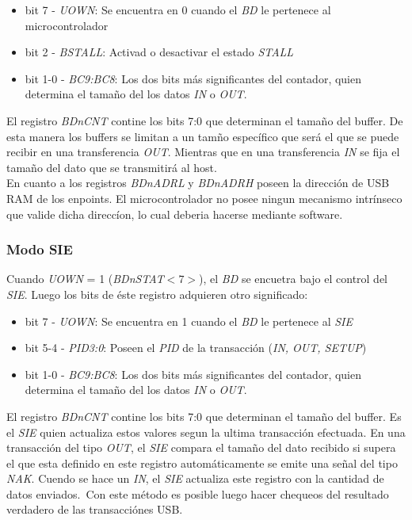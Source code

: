 \begin{itemize}
 \item bit 7 - \emph{UOWN}: Se encuentra en 0 cuando el \emph{BD} le pertenece
al microcontrolador

 \item bit 2 - \emph{BSTALL}: Activad o desactivar el estado \emph{STALL}

 \item bit 1-0 - \emph{BC9:BC8}: Los dos bits m\'as significantes del
contador, quien determina el tama\~no del los datos \emph{IN} o \emph{OUT}.
\end{itemize}

El registro \emph{BDnCNT} contine los bits 7:0 que determinan el tama\~no del
buffer. De esta manera los buffers se limitan a un tam\~no espec\'ifico que
ser\'a el que se puede recibir en una transferencia \emph{OUT}. Mientras que
en una transferencia \emph{IN} se fija el tama\~no del dato que se
transmitir\'a al host.\\

En cuanto a los registros \emph{BDnADRL} y \emph{BDnADRH} poseen la
direcci\'on de USB RAM de los enpoints. El microcontrolador no posee ningun
mecanismo intr\'inseco que valide dicha direcc\'ion, lo cual deberia hacerse
mediante software.\\

\subsubsection{Modo SIE}
Cuando \emph{UOWN} = 1 (\emph{BDnSTAT$<7>$}), el \emph{BD} se encuetra bajo
el control del \emph{SIE}. Luego los bits de \'este registro adquieren otro
significado:

\begin{itemize}
 \item bit 7 - \emph{UOWN}: Se encuentra en 1 cuando el \emph{BD} le pertenece
al \emph{SIE}

 \item bit 5-4 - \emph{PID3:0}: Poseen el \emph{PID} de la transacci\'on
(\emph{IN, OUT, SETUP})

 \item bit 1-0 - \emph{BC9:BC8}: Los dos bits m\'as significantes del
contador, quien determina el tama\~no del los datos \emph{IN} o \emph{OUT}.
\end{itemize}

El registro \emph{BDnCNT} contine los bits 7:0 que determinan el tama\~no del
buffer. Es el \emph{SIE} quien actualiza estos valores segun la ultima
transacci\'on efectuada. En una transacci\'on del tipo \emph{OUT}, el
\emph{SIE} compara el tama\~no del dato recibido si supera el que esta
definido en este registro autom\'aticamente se emite una se\~nal del tipo
\emph{NAK}. Cuendo se hace un \emph{IN}, el \emph{SIE} actualiza este registro
con la cantidad de datos enviados.\
Con este m\'etodo es posible luego hacer chequeos del resultado verdadero de
las transacci\'ones USB. 






